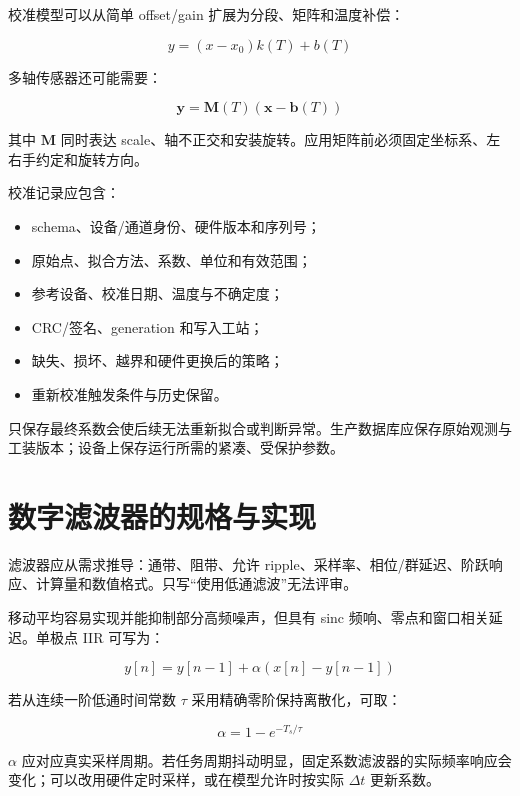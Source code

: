 校准模型可以从简单 offset/gain 扩展为分段、矩阵和温度补偿：

\begin{equation}
  y=(x-x_0)k(T)+b(T)
\end{equation}

多轴传感器还可能需要：

\begin{equation}
  \mathbf{y}=\mathbf{M}(T)(\mathbf{x}-\mathbf{b}(T))
\end{equation}

其中 $\mathbf{M}$ 同时表达 scale、轴不正交和安装旋转。应用矩阵前必须固定坐标系、左右手约定和旋转方向。

校准记录应包含：

\begin{itemize}
  \item schema、设备/通道身份、硬件版本和序列号；
  \item 原始点、拟合方法、系数、单位和有效范围；
  \item 参考设备、校准日期、温度与不确定度；
  \item CRC/签名、generation 和写入工站；
  \item 缺失、损坏、越界和硬件更换后的策略；
  \item 重新校准触发条件与历史保留。
\end{itemize}

只保存最终系数会使后续无法重新拟合或判断异常。生产数据库应保存原始观测与工装版本；设备上保存运行所需的紧凑、受保护参数。

\section{数字滤波器的规格与实现}

滤波器应从需求推导：通带、阻带、允许 ripple、采样率、相位/群延迟、阶跃响应、计算量和数值格式。只写“使用低通滤波”无法评审。

移动平均容易实现并能抑制部分高频噪声，但具有 sinc 频响、零点和窗口相关延迟。单极点 IIR 可写为：

\begin{equation}
  y[n]=y[n-1]+\alpha(x[n]-y[n-1])
\end{equation}

若从连续一阶低通时间常数 $\tau$ 采用精确零阶保持离散化，可取：

\begin{equation}
  \alpha=1-e^{-T_s/\tau}
\end{equation}

$\alpha$ 应对应真实采样周期。若任务周期抖动明显，固定系数滤波器的实际频率响应会变化；可以改用硬件定时采样，或在模型允许时按实际 $\Delta t$ 更新系数。

